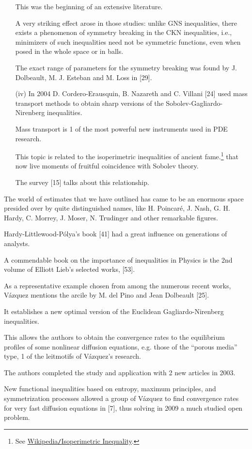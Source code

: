 \documentclass{article}
\begin{document}
\begin{itemize}
	This was the beginning of an extensive literature.
	
	A very striking effect arose in those studies: unlike GNS inequalities, there exists a phenomenon of symmetry breaking in the CKN inequalities, i.e., minimizers of such inequalities need not be symmetric functions, even when posed in the whole space or in balls.
	
	The exact range of parameters for the symmetry breaking was found by J. Dolbeault, M. J. Esteban and M. Loss in [29].
	\item[(iv)] In 2004 D. Cordero-Erausquin, B. Nazareth and C. Villani [24] used mass transport methods to obtain sharp versions of the Sobolev-Gagliardo-Nirenberg inequalities.
	
	Mass transport is 1 of the most powerful new instruments used in PDE research.
	
	This topic is related to the isoperimetric inequalities of ancient fame.\footnote{See \href{https://en.wikipedia.org/wiki/Isoperimetric-inequality}{Wikipedia{\tt/}Isoperimetric Inequality}.} that now live moments of fruitful coincidence with Sobolev theory.
	
	The survey [15] talks about this relationship.
\end{itemize}
The world of estimates that we have outlined has came to be an enormous space presided over by quite distinguished names, like H. Poincar\'e, J. Nash, G. H. Hardy, C. Morrey, J. Moser, N. Trudinger and other remarkable figures.

Hardy-Littlewood-P\'olya's book [41] had a great influence on generations of analysts.

A commendable book on the importance of inequalities in Physics is the 2nd volume of Elliott Lieb's selected works, [53].

%
As a representative example chosen from among the numerous recent works, V\'azquez mentions the arcile by M. del Pino and Jean Dolbeault [25].

It establishes a new optimal version of the Euclidean Gagliardo-Nirenberg inequalities.

This allows the authors to obtain the convergence rates to the equilibrium profiles of some nonlinear diffusion equations, e.g. those of the ``porous media'' type, 1 of the leitmotifs of V\'azquez's research.

The authors completed the study and application with 2 new articles in 2003.

New functional inequalities based on entropy, maximum principles, and symmetrization processes allowed a group of V\'azquez to find convergence rates for very fast diffusion equations in [7], thus solving in 2009 a much studied open problem.
\end{document}
